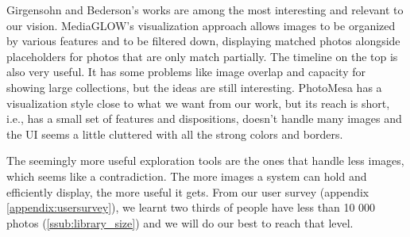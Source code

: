 {Girgensohn and Bederson's works are among the most interesting and relevant to our vision. MediaGLOW's \cite{Girgensohn:2010} visualization approach allows images to be organized by various features and to be filtered down, displaying matched photos alongside placeholders for photos that are only match partially. The timeline on the top is also very useful. It has some problems like image overlap and capacity for showing large collections, but the ideas are still interesting. PhotoMesa \cite{Bederson:2001:PZI:502348.502359} has a visualization style close to what we want from our work, but its reach is short, i.e., has a small set of features and dispositions, doesn't handle many images and the \ac{UI} seems a little cluttered with all the strong colors and borders.

The seemingly more useful exploration tools are the ones that handle less images, which seems like a contradiction. The more images a system can hold and efficiently display, the more useful it gets. From our user survey (appendix \ref{appendix:usersurvey}), we learnt two thirds of people have less than 10 000 photos (\ref{ssub:library_size}) and we will do our best to reach that level.

}